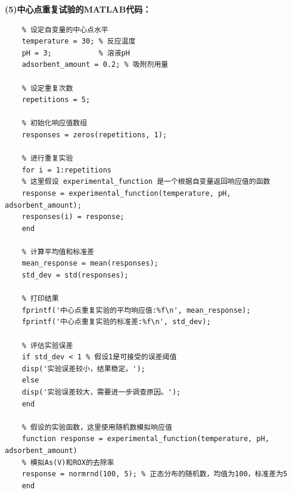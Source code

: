 \documentclass[AutoFakeBold]{ctexart}
\begin{document}
 \centering\textbf{(5)中心点重复试验的MATLAB代码：}
 \lstset{language=MATLAB}
 \lstset{breaklines}%
 \begin{lstlisting}
 	% 设定自变量的中心点水平
 	temperature = 30; % 反应温度
 	pH = 3;           % 溶液pH
 	adsorbent_amount = 0.2; % 吸附剂用量
 	
 	% 设定重复次数
 	repetitions = 5;
 	
 	% 初始化响应值数组
 	responses = zeros(repetitions, 1);
 	
 	% 进行重复实验
 	for i = 1:repetitions
 	% 这里假设 experimental_function 是一个根据自变量返回响应值的函数
 	response = experimental_function(temperature, pH, adsorbent_amount);
 	responses(i) = response;
 	end
 	
 	% 计算平均值和标准差
 	mean_response = mean(responses);
 	std_dev = std(responses);
 	
 	% 打印结果
 	fprintf('中心点重复实验的平均响应值:%f\n', mean_response);
 	fprintf('中心点重复实验的标准差:%f\n', std_dev);
 	
 	% 评估实验误差
 	if std_dev < 1 % 假设1是可接受的误差阈值
 	disp('实验误差较小，结果稳定。');
 	else
 	disp('实验误差较大，需要进一步调查原因。');
 	end
 	
 	% 假设的实验函数，这里使用随机数模拟响应值
 	function response = experimental_function(temperature, pH, adsorbent_amount)
 	% 模拟As(V)和ROX的去除率
 	response = normrnd(100, 5); % 正态分布的随机数，均值为100，标准差为5
 	end
 \end{lstlisting}
 
\end{document}
